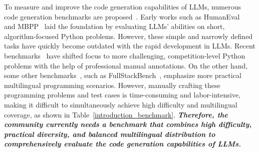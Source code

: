 To measure and improve the code generation capabilities of LLMs, numerous code generation benchmarks are proposed~\citep{wang2025softwaredevelopmentlifecycle}. Early works such as HumanEval~\citep{chen2021evaluatinglargelanguagemodels} and MBPP~\citep{austin2021programsynthesislargelanguage} laid the foundation by evaluating LLMs' abilities on short, algorithm-focused Python problems. However, these simple and narrowly defined tasks have quickly become outdated with the rapid development in LLMs. Recent benchmarks~\citep{quan2025codeelobenchmarkingcompetitionlevelcode,jain2025livecodebench,zheng2025livecodebenchproolympiadmedalists,zhu2025oibenchbenchmarkingstrongreasoning} have shifted focus to more challenging, competition-level Python problems with the help of professional manual annotations. %
On the other hand, some other benchmarks~\citep{peng2024humanevalxlmultilingualcodegeneration,chai2025mceval,fullstackbench}, such as FullStackBench~\citep{fullstackbench}, emphasize more practical multilingual programming scenarios. However, manually crafting these programming problems and test cases is time-consuming and labor-intensive, making it difficult to simultaneously achieve high difficulty and multilingual coverage, as shown in Table~\ref{introduction_benchmark}. \textbf{\textit{Therefore, the community currently needs a benchmark that combines high difficulty, practical diversity, and balanced multilingual distribution to comprehensively evaluate the code generation capabilities of LLMs.}}






